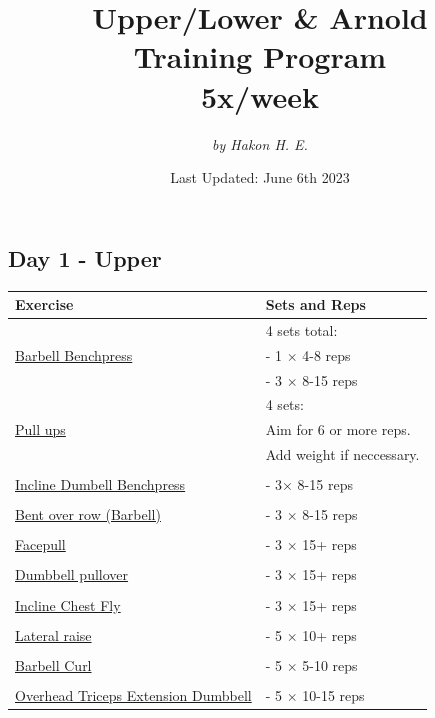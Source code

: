 \documentclass[11pt]{article}
\title{\Huge Upper/Lower \& Arnold  \\ Training Program \\ \large 5x/week}
\date{Last Updated: June 6th 2023}
\author{\textit{by Hakon H. E.}}
\begin{document}
\maketitle
\subsection*{Day 1 - Upper}
\begin{center}
\begin{tabular}{|l|l|}
\hline
\textbf{Exercise} & \textbf{Sets and Reps}\\
\hline
& 4 sets total: \\
\href{https://www.youtube.com/shorts/0cXAp6WhSj4}{Barbell Benchpress} & - 1  $\times$ 4-8 reps \\
& - 3  $\times$ 8-15 reps \\
\hline
&  4 sets: \\
\href{https://www.youtube.com/watch?v=eGo4IYlbE5g}{Pull ups} & Aim for 6 or more reps. \\
& Add weight if neccessary.\\
\hline
&\\
\href{https://www.youtube.com/watch?v=0f6-uCUKqgA}{Incline Dumbell Benchpress} & - 3$\times$ 8-15 reps \\
\hline
&\\
\href{https://www.youtube.com/shorts/3OAG3sTlljk}{Bent over row (Barbell)} & - 3 $\times$ 8-15 reps \\
\hline
&\\
\href{https://www.youtube.com/watch?v=eFxMixk_qPQ}{Facepull} & - 3 $\times$ 15+ reps \\
\hline
&\\
\href{https://www.youtube.com/watch?v=FK4rHfWKEac}{Dumbbell pullover} & - 3 $\times$ 15+ reps\\
\hline
&\\
\href{https://www.youtube.com/watch?v=ajdFwa-qM98}{Incline Chest Fly} & - 3 $\times$ 15+ reps\\
\hline
&\\
\href{https://www.youtube.com/watch?v=n5dsI9qQXwY}{Lateral raise} & - 5 $\times$ 10+ reps\\
\hline
&\\
\href{https://www.youtube.com/watch?v=bAWLx7PPK10}{Barbell Curl} & - 5 $\times$ 5-10 reps \\
\hline
&\\
\href{https://www.youtube.com/watch?v=\_gsUck-7M74}{Overhead Triceps Extension Dumbbell} & - 5 $\times$ 10-15 reps \\
\hline

\end{tabular}
\end{center}
\end{document}
